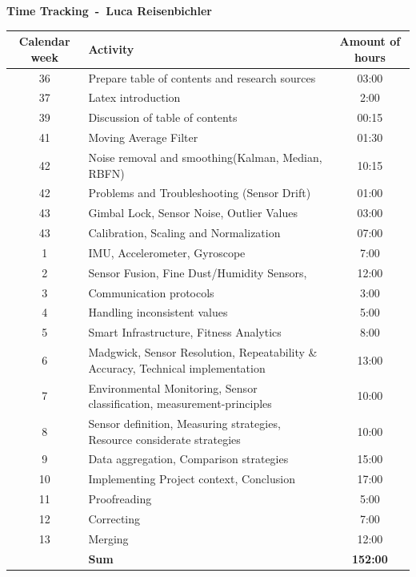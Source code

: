\textbf{\huge Time Tracking~-~Luca Reisenbichler}

\begin{table}[H]
    \centering
    \begin{tabularx}{\textwidth}{|c|X|c|} %
        \hline %
        Calendar week & Activity & Amount of hours \\
        \hline %
        36 & Prepare table of contents and research sources & 03:00 \\
        \hline %
        37 & Latex introduction & 2:00 \\
        \hline %
        39 & Discussion of table of contents & 00:15 \\
        \hline %
        41 & Moving Average Filter & 01:30 \\
        \hline %
        42 & Noise removal and smoothing(Kalman, Median, RBFN) & 10:15 \\
        \hline %
        42 & Problems and Troubleshooting (Sensor Drift) & 01:00 \\
        \hline %
        43 & Gimbal Lock, Sensor Noise, Outlier Values & 03:00 \\
        \hline %
        43 & Calibration, Scaling and Normalization & 07:00 \\
        \hline %
        1 & IMU, Accelerometer, Gyroscope & 7:00\\
        \hline %
        2 & Sensor Fusion, Fine Dust/Humidity Sensors, & 12:00\\
        \hline %
        3 & Communication protocols & 3:00\\
        \hline %
        4 & Handling inconsistent values & 5:00\\
        \hline %
        5 & Smart Infrastructure, Fitness Analytics & 8:00\\
        \hline %
        6 & Madgwick, Sensor Resolution, Repeatability \& Accuracy, Technical implementation & 13:00\\
        \hline %
        7 & Environmental Monitoring, Sensor classification, measurement-principles & 10:00\\
        \hline %
        8 & Sensor definition, Measuring strategies, Resource considerate strategies & 10:00\\
        \hline %
        9 & Data aggregation, Comparison strategies & 15:00\\
        \hline %
        10 & Implementing Project context, Conclusion & 17:00\\
        \hline %
        11 & Proofreading & 5:00\\
        \hline %
        12 & Correcting & 7:00\\
        \hline %
        13 & Merging & 12:00\\
        \hline %
        & \textbf{Sum} & \textbf{152:00} \\
        \hline %
    \end{tabularx}
\end{table}